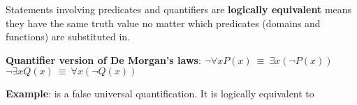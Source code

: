 Statements involving predicates and quantifiers are {\bf logically equivalent} 
means they have the same truth value no matter which predicates (domains and functions) are substituted in. 

{\bf Quantifier version of De Morgan's laws}: 
$\boxed{\neg \forall x P(x) ~\equiv~ \exists x \left( \neg P(x) \right)}$
\qquad
\qquad
$\boxed{\neg \exists x Q(x) ~\equiv~ \forall x \left( \neg Q(x) \right)}$


{\bf Example}: 
\underline{\phantom{$\forall x ~(P(x) \lor N(x))$}} is a false universal quantification. It is logically equivalent to \underline{\phantom{$\exists x ~\not (P(x) \lor N(x))$}}





\vfill